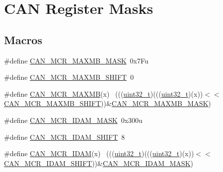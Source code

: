 \hypertarget{group___c_a_n___register___masks}{}\section{C\+AN Register Masks}
\label{group___c_a_n___register___masks}
\subsection*{Macros}
\begin{DoxyCompactItemize}
\item 
\#define \hyperlink{group___c_a_n___register___masks_ga86b59c74c0b9f310c3922c7c8c04dd03}{C\+A\+N\+\_\+\+M\+C\+R\+\_\+\+M\+A\+X\+M\+B\+\_\+\+M\+A\+SK}~0x7\+Fu
\item 
\#define \hyperlink{group___c_a_n___register___masks_ga0807275385d5041baeca3bb7ddb4bdf5}{C\+A\+N\+\_\+\+M\+C\+R\+\_\+\+M\+A\+X\+M\+B\+\_\+\+S\+H\+I\+FT}~0
\item 
\#define \hyperlink{group___c_a_n___register___masks_ga7d840ec6bea7287110c94cda3613bb7d}{C\+A\+N\+\_\+\+M\+C\+R\+\_\+\+M\+A\+X\+MB}(x)                                              ~(((\hyperlink{_p_e___types_8h_a33594304e786b158f3fb30289278f5af}{uint32\+\_\+t})(((\hyperlink{_p_e___types_8h_a33594304e786b158f3fb30289278f5af}{uint32\+\_\+t})(x))$<$$<$\hyperlink{group___c_a_n___register___masks_ga0807275385d5041baeca3bb7ddb4bdf5}{C\+A\+N\+\_\+\+M\+C\+R\+\_\+\+M\+A\+X\+M\+B\+\_\+\+S\+H\+I\+FT}))\&\hyperlink{group___c_a_n___register___masks_ga86b59c74c0b9f310c3922c7c8c04dd03}{C\+A\+N\+\_\+\+M\+C\+R\+\_\+\+M\+A\+X\+M\+B\+\_\+\+M\+A\+SK})
\item 
\#define \hyperlink{group___c_a_n___register___masks_ga758ccb033a3d823109f8bf4e23b46827}{C\+A\+N\+\_\+\+M\+C\+R\+\_\+\+I\+D\+A\+M\+\_\+\+M\+A\+SK}~0x300u
\item 
\#define \hyperlink{group___c_a_n___register___masks_gae76a75d680b0c33f41429f14132ee78f}{C\+A\+N\+\_\+\+M\+C\+R\+\_\+\+I\+D\+A\+M\+\_\+\+S\+H\+I\+FT}~8
\item 
\#define \hyperlink{group___c_a_n___register___masks_ga18ead0b4277d8ce2b1bd4fe80769c46f}{C\+A\+N\+\_\+\+M\+C\+R\+\_\+\+I\+D\+AM}(x)                                                ~(((\hyperlink{_p_e___types_8h_a33594304e786b158f3fb30289278f5af}{uint32\+\_\+t})(((\hyperlink{_p_e___types_8h_a33594304e786b158f3fb30289278f5af}{uint32\+\_\+t})(x))$<$$<$\hyperlink{group___c_a_n___register___masks_gae76a75d680b0c33f41429f14132ee78f}{C\+A\+N\+\_\+\+M\+C\+R\+\_\+\+I\+D\+A\+M\+\_\+\+S\+H\+I\+FT}))\&\hyperlink{group___c_a_n___register___masks_ga758ccb033a3d823109f8bf4e23b46827}{C\+A\+N\+\_\+\+M\+C\+R\+\_\+\+I\+D\+A\+M\+\_\+\+M\+A\+SK})

\end{DoxyCompactItemize}
